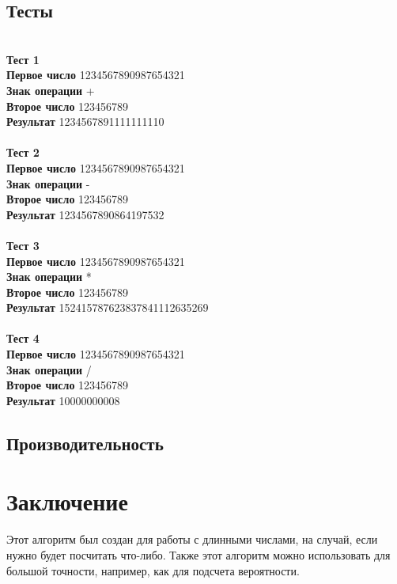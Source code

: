 \documentclass[a4paper]{article}
\begin{document}
\subsection{Тесты}
\\ \textbf{Тест 1}
\\ \textbf{Первое число} 1234567890987654321
\\ \textbf{Знак операции} +
\\ \textbf{Второе число} 123456789
\\ \textbf{Результат} 1234567891111111110
\\
\\ \textbf{Тест 2}
\\ \textbf{Первое число} 1234567890987654321
\\ \textbf{Знак операции} -
\\ \textbf{Второе число} 123456789
\\ \textbf{Результат} 1234567890864197532
\\
\\ \textbf{Тест 3}
\\ \textbf{Первое число} 1234567890987654321
\\ \textbf{Знак операции} *
\\ \textbf{Второе число} 123456789
\\ \textbf{Результат} 152415787623837841112635269
\\
\\ \textbf{Тест 4}
\\ \textbf{Первое число} 1234567890987654321
\\ \textbf{Знак операции} /
\\ \textbf{Второе число} 123456789
\\ \textbf{Результат} 10000000008

\subsection{Производительность}
\newpage

\section{Заключение}
Этот алгоритм был создан для работы с длинными числами, на случай, если нужно будет посчитать что-либо. Также этот алгоритм можно использовать для большой точности, например, как для подсчета вероятности.
\newpage


\end{document}
